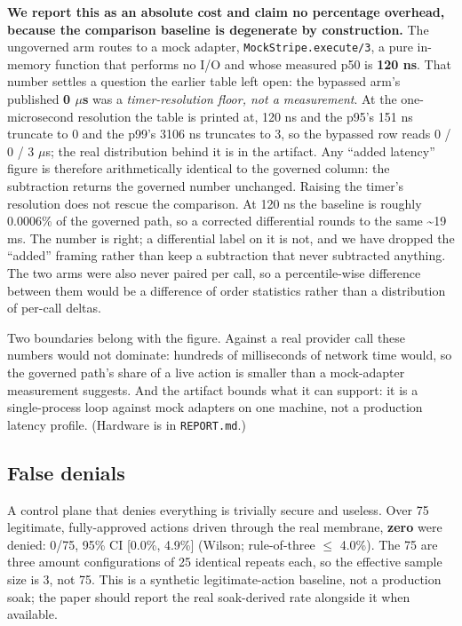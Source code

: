 \documentclass[11pt]{article}
\begin{document}
\textbf{We report this as an absolute cost and claim no percentage overhead, because the comparison
baseline is degenerate by construction.} The ungoverned arm routes to a mock adapter,
\texttt{MockStripe.execute/3}, a pure in-memory function that performs no I/O and whose measured
p50 is \textbf{120 ns}. That number settles a question the earlier table left open: the bypassed
arm's published \textbf{0 $\mu$s} was a \emph{timer-resolution floor, not a measurement}. At the
one-microsecond resolution the table is printed at, 120 ns and the p95's 151 ns truncate to 0 and
the p99's 3106 ns truncates to 3, so the bypassed row reads 0 / 0 / 3 $\mu$s; the real distribution
behind it is in the artifact. Any ``added latency'' figure is therefore arithmetically identical to
the governed column: the subtraction returns the governed number unchanged. Raising the timer's
resolution does not rescue the comparison. At 120 ns the baseline is roughly 0.0006\% of the
governed path, so a corrected differential rounds to the same \textasciitilde19 ms. The number is
right; a differential label on it is not, and we have dropped the ``added'' framing rather than keep
a subtraction that never subtracted anything. The two arms were also never paired per call, so a
percentile-wise difference between them would be a difference of order statistics rather than a
distribution of per-call deltas.

Two boundaries belong with the figure. Against a real provider call these numbers would not
dominate: hundreds of milliseconds of network time would, so the governed path's share of a live
action is smaller than a mock-adapter measurement suggests. And the artifact bounds what it can
support: it is a single-process loop against mock adapters on one machine, not a production latency
profile. (Hardware is in \texttt{REPORT.md}.)

\subsection{False denials}\label{false-denials}

A control plane that denies everything is trivially secure and useless. Over 75 legitimate,
fully-approved actions driven through the real membrane, \textbf{zero} were denied: 0/75, 95\% CI {[}0.0\%, 4.9\%{]} (Wilson; rule-of-three $\leq$ 4.0\%). The 75 are three amount configurations of 25 identical repeats each, so the effective sample size is 3, not 75. This is a
synthetic legitimate-action baseline, not a production soak; the paper should report the real
soak-derived rate alongside it when available.
\end{document}
